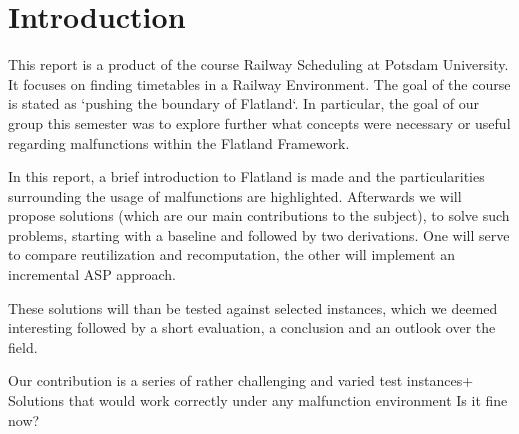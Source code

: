 \section{Introduction}

This report is a product of the course Railway Scheduling at Potsdam University. It focuses on finding timetables in a Railway Environment. The goal of the course is stated as `pushing the boundary of Flatland`. In particular, the goal of our group this semester was to explore further what concepts were necessary or useful regarding malfunctions within the Flatland Framework.

In this report, a brief introduction to Flatland is made and the particularities surrounding the usage of malfunctions are highlighted. Afterwards we will propose solutions (which are our main contributions to the subject), to solve such problems, starting with a baseline and followed by two derivations. One will serve to compare reutilization and recomputation, the other will implement an incremental ASP approach.

These solutions will than be tested against selected instances, which we deemed interesting followed by a short evaluation, a conclusion and an outlook over the field.

\color{red}
Our contribution is a series of rather challenging and varied test instances+  
Solutions that would work correctly under any malfunction environment
\color{black}
\color{green} Is it fine now? \color{black}